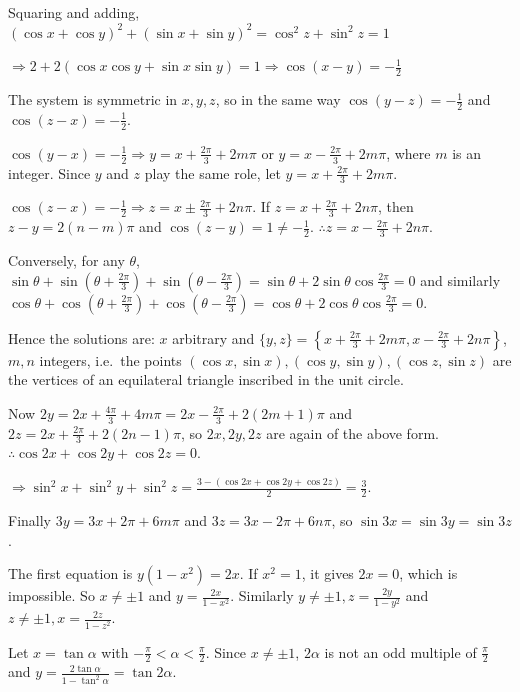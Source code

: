   Squaring and adding, $(\cos x + \cos y)^2 + (\sin x + \sin y)^2 = \cos^2z + \sin^2z = 1$

  $\Rightarrow 2 + 2(\cos x\cos y + \sin x\sin y) = 1\Rightarrow \cos(x - y) = -\frac{1}{2}$

  The system is symmetric in $x, y, z$, so in the same way $\cos(y - z) = -\frac{1}{2}$ and $\cos(z - x) =
  -\frac{1}{2}$.

  $\cos(y - x) = -\frac{1}{2}\Rightarrow y = x + \frac{2\pi}{3} + 2m\pi$ or $y = x - \frac{2\pi}{3} + 2m\pi$,
  where $m$ is an integer. Since $y$ and $z$ play the same role, let $y = x + \frac{2\pi}{3} + 2m\pi$.

  $\cos(z - x) = -\frac{1}{2}\Rightarrow z = x\pm\frac{2\pi}{3} + 2n\pi$. If $z = x + \frac{2\pi}{3} + 2n\pi$,
  then $z - y = 2(n - m)\pi$ and $\cos(z - y) = 1\neq -\frac{1}{2}$. $\therefore z = x - \frac{2\pi}{3} +
  2n\pi$.

  Conversely, for any $\theta$, $\sin\theta + \sin\left(\theta + \frac{2\pi}{3}\right) + \sin\left(\theta -
  \frac{2\pi}{3}\right) = \sin\theta + 2\sin\theta\cos\frac{2\pi}{3} = 0$ and similarly $\cos\theta +
  \cos\left(\theta + \frac{2\pi}{3}\right) + \cos\left(\theta - \frac{2\pi}{3}\right) = \cos\theta +
  2\cos\theta\cos\frac{2\pi}{3} = 0$.

  Hence the solutions are: $x$ arbitrary and $\{y, z\} = \left\{x + \frac{2\pi}{3} + 2m\pi, x - \frac{2\pi}{3}
  + 2n\pi\right\}$, $m, n$ integers, i.e.\ the points $(\cos x, \sin x), (\cos y, \sin y), (\cos z, \sin z)$
  are the vertices of an equilateral triangle inscribed in the unit circle.

  Now $2y = 2x + \frac{4\pi}{3} + 4m\pi = 2x - \frac{2\pi}{3} + 2(2m + 1)\pi$ and $2z = 2x + \frac{2\pi}{3} +
  2(2n - 1)\pi$, so $2x, 2y, 2z$ are again of the above form. $\therefore\cos2x + \cos2y + \cos2z = 0$.

  $\Rightarrow\sin^2x + \sin^2y + \sin^2z = \frac{3 - (\cos2x + \cos2y + \cos2z)}{2} = \frac{3}{2}$.

  Finally $3y = 3x + 2\pi + 6m\pi$ and $3z = 3x - 2\pi + 6n\pi$, so $\sin3x = \sin3y = \sin3z$.
\item The first equation is $y(1 - x^2) = 2x$. If $x^2 = 1$, it gives $2x = 0$, which is impossible. So $x\neq
  \pm1$ and $y = \frac{2x}{1 - x^2}$. Similarly $y\neq\pm1, z = \frac{2y}{1 - y^2}$ and $z\neq\pm1, x =
  \frac{2z}{1 - z^2}$.

  Let $x = \tan\alpha$ with $-\frac{\pi}{2} < \alpha < \frac{\pi}{2}$. Since $x\neq\pm1$, $2\alpha$ is not an
  odd multiple of $\frac{\pi}{2}$ and $y = \frac{2\tan\alpha}{1 - \tan^2\alpha} = \tan2\alpha$.

